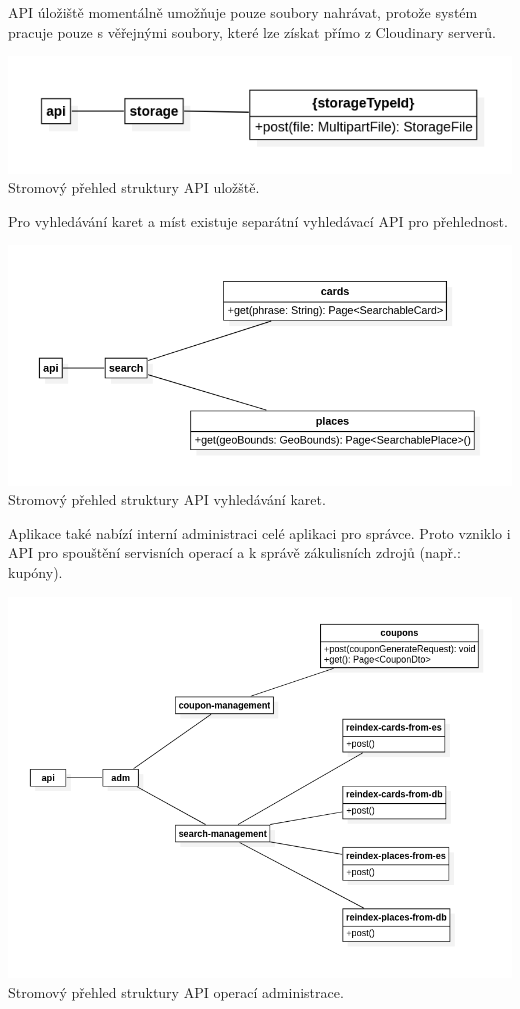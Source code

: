 \begin{itemize}
\begin{itemize}
		\ac{API} úložiště momentálně umožňuje pouze soubory nahrávat, protože systém pracuje pouze s věřejnými soubory, které
		lze získat přímo z Cloudinary serverů.

		\includegraphics{obrazky/api_model_uloziste}\hfill
		Stromový přehled struktury API uložště. %

		Pro vyhledávání karet a míst existuje separátní vyhledávací \ac{API} pro přehlednost.

		\includegraphics{obrazky/api_model_vyhledavani}\hfill
		Stromový přehled struktury API vyhledávání karet. %

		Aplikace také nabízí interní administraci celé aplikaci pro správce.
		Proto vzniklo i \ac{API} pro spouštění servisních operací a k správě zákulisních zdrojů (např.: kupóny).

		\includegraphics{obrazky/api_model_adm}\hfill
		Stromový přehled struktury API operací administrace. %



\end{itemize}
\end{itemize}
